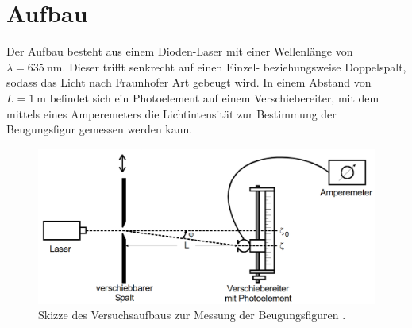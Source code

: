 \section{Aufbau}
\label{sec:Aufbau}

Der Aufbau besteht aus einem Dioden-Laser mit einer Wellenlänge von $\lambda = \SI{635}{\nano\metre}$. Dieser trifft senkrecht auf einen Einzel- beziehungsweise Doppelspalt, sodass das Licht nach Fraunhofer Art gebeugt wird. In einem Abstand von $L=\SI{1}{\metre}$ befindet sich ein Photoelement auf einem Verschiebereiter, mit dem mittels eines Amperemeters die Lichtintensität zur Bestimmung der Beugungsfigur gemessen werden kann.

\begin{figure}
	\centering
	\includegraphics[width=\linewidth-70pt,height=\textheight-70pt,keepaspectratio]{content/images/Aufbau.png}
	\caption{Skizze des Versuchsaufbaus zur Messung der Beugungsfiguren \cite{V406}.}
	\label{fig:Aufbau}
\end{figure}
